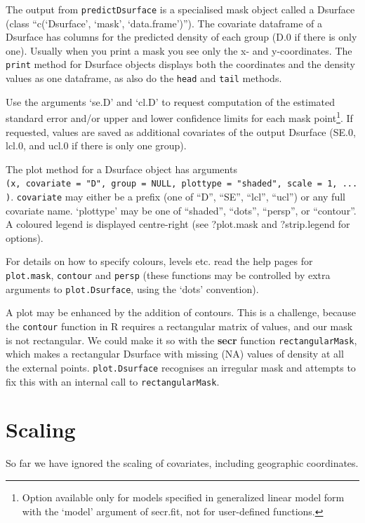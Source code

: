 \documentclass[
]{book}
\begin{document}
The output from \texttt{predictDsurface} is a specialised mask object called a Dsurface (class ``c(`Dsurface', `mask', `data.frame')''). The covariate dataframe of a Dsurface has columns for the predicted density of each group (D.0 if there is only one). Usually when you print a mask you see only the x- and y-coordinates. The \texttt{print} method for Dsurface objects displays both the coordinates and the density values as one dataframe, as also do the \texttt{head} and \texttt{tail} methods.

Use the arguments `se.D' and `cl.D' to request computation of the estimated standard error and/or upper and lower confidence limits for each mask point\footnote{Option available only for models specified in generalized linear model form with the `model' argument of secr.fit, not for user-defined functions.}. If requested, values are saved as additional covariates of the output Dsurface (SE.0, lcl.0, and ucl.0 if there is only one group).

The plot method for a Dsurface object has arguments \texttt{(x,\ covariate\ =\ "D",\ group\ =\ NULL,\ plottype\ =\ "shaded",\ scale\ =\ 1,\ ...)}. \texttt{covariate} may either be a prefix (one of ``D'', ``SE'', ``lcl'', ``ucl'') or any full covariate name. `plottype' may be one of ``shaded'', ``dots'', ``persp'', or ``contour''. A coloured legend is displayed centre-right (see ?plot.mask and ?strip.legend for options).

For details on how to specify colours, levels etc. read the help pages for \texttt{plot.mask}, \texttt{contour} and \texttt{persp} (these functions may be controlled by extra arguments to \texttt{plot.Dsurface}, using the `dots' convention).

A plot may be enhanced by the addition of contours. This is a challenge, because the \texttt{contour} function in R requires a rectangular matrix of values, and our mask is not rectangular. We could make it so with the \textbf{secr} function \texttt{rectangularMask}, which makes a rectangular Dsurface with missing (NA) values of density at all the external points. \texttt{plot.Dsurface} recognises an irregular mask and attempts to fix this with an internal call to \texttt{rectangularMask}.

\section{Scaling}\label{scaling}

So far we have ignored the scaling of covariates, including geographic coordinates.
\end{document}
